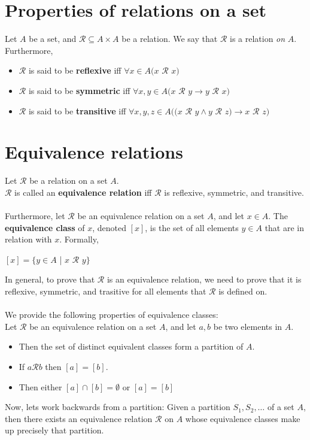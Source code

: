 \documentclass[a4paper]{article}
\begin{document}
\section{Properties of relations on a set}
Let $A$ be a set, and $\mathcal{R} \subseteq A \times A$ be a relation. We say that $\mathcal{R}$ is a relation \textit{on} $A$.
Furthermore,
\begin{itemize}
	\item $\mathcal{R}$ is said to be \textbf{reflexive} iff $\forall x \in A (x $ $\mathcal{R}$ $x)$
	\item $\mathcal{R}$ is said to be \textbf{symmetric} iff $\forall x, y \in A (x $ $\mathcal{R}$ $y \rightarrow y$ $\mathcal{R}$ $x)$
	\item $\mathcal{R}$ is said to be \textbf{transitive} iff $\forall x, y, z \in A ((x $ $\mathcal{R}$ $y \land y$ $\mathcal{R}$ $z) \rightarrow x$ $\mathcal{R}$ $z)$
\end{itemize}

\section{Equivalence relations}
Let $\mathcal{R}$ be a relation on a set $A$.\\
$\mathcal{R}$ is called an \textbf{equivalence relation} iff $\mathcal{R}$ is reflexive, symmetric, and transitive.\\\\
Furthermore, let $\mathcal{R}$ be an equivalence relation on a set $A$, and let $x \in A$. The \textbf{equivalence class} of $x$, denoted $[x]$, is the set of all elements $y\in A$ that are in relation with $x$. Formally,
\begin{center}
	$[x] = \{y \in A$ | $x$ $\mathcal{R}$ $y\}$
\end{center}
In general, to prove that $\mathcal{R}$ is an equivalence relation, we need to prove that it is reflexive, symmetric, and trasitive for all elements that $\mathcal{R}$ is defined on.\\ \\
We provide the following properties of equivalence classes:\\
Let $\mathcal{R}$ be an equivalence relation on a set $A$, and let $a,b$ be two elements in $A$.
\begin{itemize}
	\item Then the set of distinct equivalent classes form a partition of $A$.
	\item If $a \mathcal{R} b$ then $[a] = [b]$.
	\item Then either $[a] \cap [b] = \emptyset$ or $[a] = [b]$
\end{itemize}
Now, lets work backwards from a partition: Given a partition $S_1, S_2,\dots$ of a set $A$, then there exists an equivalence relation $\mathcal{R}$ on $A$ whose equivalence classes make up precisely that partition.
\end{document}
